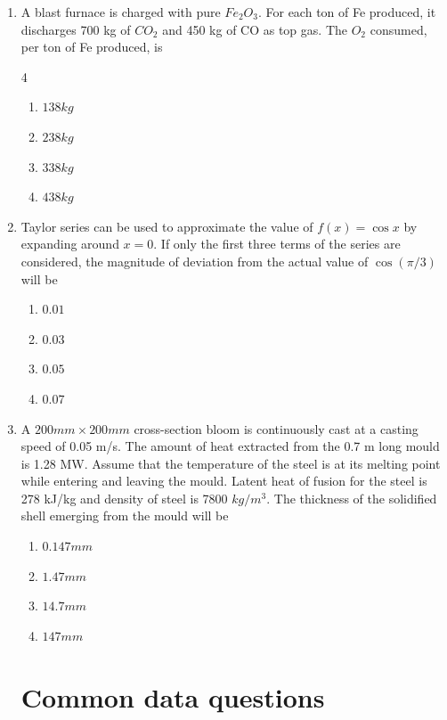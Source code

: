 \documentclass[journal]{IEEEtran}
\theoremstyle{remark}
\begin{document}
\begin{enumerate}
\item   A blast furnace is charged with pure $Fe_2O_3$. For each ton of Fe produced, it discharges 700 kg of $CO_2$ and 450 kg of CO as top gas. The $O_2$ consumed, per ton of Fe produced, is
\hfill{}

\begin {multicols}{4}
\begin{enumerate}
\item$138 kg$
\item $238 kg$
\item  $338 kg$ 
\item  $438 kg$
\end{enumerate}
\end{multicols}

\item   Taylor series can be used to approximate the value of $f(x) = \cos{x}$ by expanding around $x = 0$. If only the first three terms of the series are considered, the magnitude of deviation from the actual value of $\cos({\pi/3})$ will be
\hfill{}
\begin{multicols}{4}
\begin{enumerate}
\item  $0.01$
\item $0.03$
\item $0.05$
\item $0.07$
\end{enumerate}
\end{multicols}

\item  A $200 mm \times 200 mm$ cross-section bloom is continuously cast at a casting speed of 0.05 m/s. The amount of heat extracted from the 0.7 m long mould is 1.28 MW. Assume that the temperature of the steel is at its melting point while entering and leaving the mould. Latent heat of fusion for the steel is 278 kJ/kg and density of steel is 7800 $kg/m^3$. The thickness of the solidified shell emerging from the
mould will be \hfill{}
\begin{multicols}{4}
\begin{enumerate}
\item $0.147 mm$
\item $1.47 mm$
\item  $14.7 mm$
\item  $147 mm$
\end{enumerate}
\end{multicols}
\section*{Common data questions}

\end{enumerate}
\end{document}
